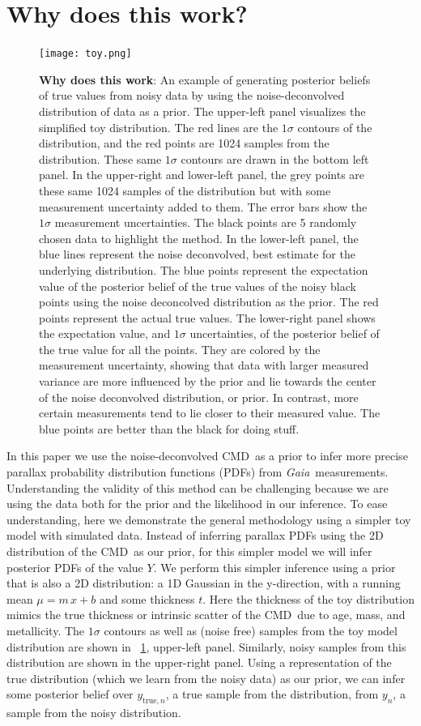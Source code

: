 \documentclass[modern]{aastex61}
\newcommand{\acronym}[1]{{\small{#1}}}
\newcommand{\project}[1]{\textsl{#1}}
\newcommand{\gaia}{\project{Gaia}}
\newcommand{\cmd}{\acronym{CMD}}
\newcommand{\true}{\mathrm{true}}
\begin{document}
\section{Why does this work?}
\begin{figure}
\centering
  \texttt{[image: toy.png]}
\caption{ {\bf Why does this work}: An example of generating posterior beliefs of true values from noisy data by using the noise-deconvolved distribution of data as a prior. The upper-left panel visualizes the simplified toy distribution. The red lines are the $1\sigma$ contours of the distribution, and the red points are 1024 samples from the distribution. These same $1\sigma$ contours are drawn in the bottom left panel. In the upper-right and lower-left panel, the grey points are these same 1024 samples of the distribution but with some measurement uncertainty added to them. The error bars show the $1\sigma$ measurement uncertainties. The black points are 5 randomly chosen data to highlight the method. In the lower-left panel, the blue lines represent the noise deconvolved, best estimate for the underlying distribution. The blue points represent the expectation value of the posterior belief of the true values of the noisy black points using the noise deconcolved distribution as the prior. The red points represent the actual true values. The lower-right panel shows the expectation value, and $1\sigma$ uncertainties, of the posterior belief of the true value for all the points. They are colored by the measurement uncertainty, showing that data with larger measured variance are more influenced by the prior and lie towards the center of the noise deconvolved distribution, or prior. In contrast, more certain measurements tend to lie closer to their measured value. The blue points are better than the black for doing stuff.}
\label{fig:toy}
\end{figure}

In this paper we use the noise-deconvolved \cmd\ as a prior to infer more precise parallax probability distribution functions (PDFs) from \gaia\ measurements.
Understanding the validity of this method can be challenging because we are using the data both for the prior and the likelihood in our inference.
To ease understanding, here we demonstrate the general methodology using a
simpler toy model with simulated data.
Instead of inferring parallax PDFs using the 2D distribution of the \cmd\ as our prior, for this simpler model we will infer posterior PDFs of the value $Y$.
We perform this simpler inference using a prior that is also a 2D distribution: a 1D Gaussian in the y-direction, with a running mean $\mu = m\,x + b$ and some thickness $t$.
Here the thickness of the toy distribution mimics the true thickness or intrinsic scatter of the \cmd\ due to age, mass, and metallicity.
The $1\sigma$ contours as well as (noise free) samples from the toy model distribution are shown in \figurename~\ref{fig:toy}, upper-left panel.
Similarly, noisy samples from this distribution are shown in the upper-right panel.
Using a representation of the true distribution (which we learn from the noisy data) as our prior, we can infer some posterior belief over $y_{\true,n}$, a true sample from the distribution, from $y_n$, a sample from the noisy distribution.
\end{document}
